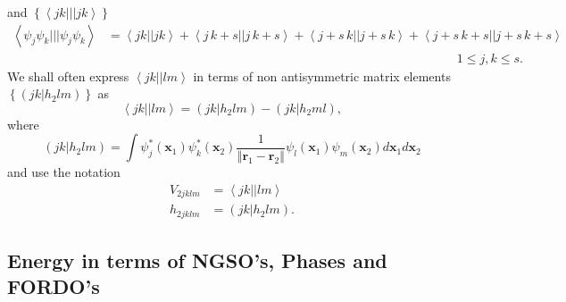 \documentclass[aps,preprint]{revtex4}%
\begin{document}
and $\left\{  \left\langle jk|||jk\right\rangle \right\}  $
\begin{align}
\left\langle \psi_{j}\psi_{k}|||\psi_{j}\psi_{k}\right\rangle  &
=\left\langle jk||jk\right\rangle +\left\langle j\,k+s||j\,k+s\right\rangle
+\left\langle j+s\,k||j+s\,k\right\rangle +\left\langle
j+s\,k+s||j+s\,k+s\right\rangle \nonumber\\
&  \left.  {}\right.  \qquad\qquad\qquad\qquad\qquad\qquad\qquad\qquad
\qquad\qquad\qquad\qquad\qquad\qquad1\leq j,k\leq s.
\end{align}
We shall often express $\left\langle jk||lm\right\rangle $ in terms of non
antisymmetric matrix elements $\left\{  \left(  \left.  jk\right\vert
h_{2}lm\right)  \right\}  $ as
\begin{equation}
\left\langle jk||lm\right\rangle =\left(  \left.  jk\right\vert h_{2}%
lm\right)  -\left(  \left.  jk\right\vert h_{2}ml\right)  ,
\end{equation}
where
\begin{equation}
\left(  \left.  jk\right\vert h_{2}lm\right)  =\int\psi_{j}^{\ast}\left(
\bm{x}_{1}\right)  \psi_{k}^{\ast}\left(  \bm{x}_{2}\right)  \frac
{1}{\left\Vert \bm{r}_{1}-\bm{r}_{2}\right\Vert }\psi_{l}\left(
\bm{x}_{1}\right)  \psi_{m}\left(  \bm{x}_{2}\right)  d\bm{x}_{1}d\bm{x}_{2}%
\end{equation}
and use the notation
\begin{align}
V_{2jklm}  &  =\left\langle jk||lm\right\rangle \nonumber\\
h_{2jklm}  &  =\left(  \left.  jk\right\vert h_{2}lm\right)  .
\end{align}


\subsection{Energy in terms of NGSO's, Phases and FORDO's\label{EnON_NGSO}}
\end{document}
